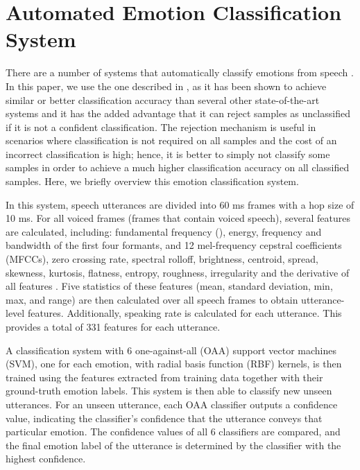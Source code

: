 \documentclass{article}
\begin{document}
\section{Automated Emotion Classification System} \label{EmoSystemSection}
There are a number of systems that automatically classify emotions from speech \cite{bitouk2010class,  rachuri2010emotionsense, schuller2003hidden, sethu2008empirical, yun2012loss}.
In this paper, we use the one described in \cite{yang2012speech}, as it has been shown to achieve similar or better classification accuracy than several other state-of-the-art systems \cite{bitouk2010class, rachuri2010emotionsense, sethu2008empirical} and it has the added advantage that it can reject samples as unclassified if it is not a confident classification. The rejection mechanism is useful in scenarios where classification is not required on all samples and the cost of an incorrect classification is high; hence, it is better to simply not classify some samples in order to achieve a much higher classification accuracy on all classified samples. Here, we briefly overview this emotion classification system. \par
In this system, speech utterances are divided into 60 ms frames with a hop size of 10 ms. For all voiced frames (frames that contain voiced speech), several features are calculated, including: fundamental frequency (), energy, frequency and bandwidth of the first four formants, and 12 mel-frequency cepstral coefficients (MFCCs), zero crossing rate, spectral rolloff, brightness, centroid, spread, skewness, kurtosis, flatness, entropy, roughness, irregularity and the derivative of all features \cite{Signal2006Process}. Five statistics of these features (mean, standard deviation, min, max, and range) are then calculated over all speech frames to obtain utterance-level features. Additionally, speaking rate is calculated for each utterance. This provides a total of 331 features for each utterance. \par
A classification system with 6 one-against-all (OAA) support vector machines (SVM), one for each emotion, with radial basis function (RBF) kernels, is then trained using the features extracted from training data together with their ground-truth emotion labels. This system is then able to classify new unseen utterances.  For an unseen utterance, each OAA classifier outputs a confidence value, indicating the classifier's confidence that the utterance conveys that particular emotion. The confidence values of all 6 classifiers are compared, and the final emotion label of the utterance is determined by the classifier with the highest confidence. \par
\end{document}
